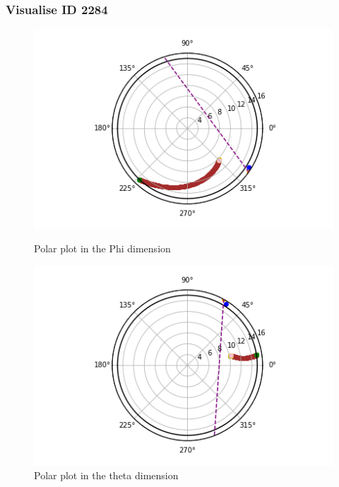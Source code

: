 \documentclass[a4paper]{article}
\begin{document}
\subsubsection{Visualise ID 2284}
\begin{figure}[H]
    \centering
    \begin{minipage}{.5\textwidth}
        \centering
        \includegraphics[width=1\linewidth]{Fast/2284_phi.png}
        \caption{Polar plot in the Phi dimension}
        \label{fig:prob1_6_2}
    \end{minipage}%
    \begin{minipage}{0.5\textwidth}
        \centering
        \includegraphics[width=1\linewidth]{Fast/2284_theta.png}
        \caption{Polar plot in the theta dimension}
        \label{fig:prob1_6_1}
    \end{minipage}
\end{figure}
\end{document}
